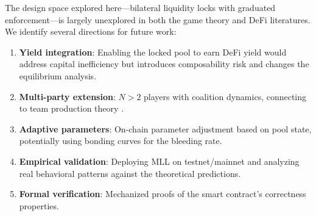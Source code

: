 \documentclass[12pt,a4paper]{article}
\begin{document}
The design space explored here---bilateral liquidity locks with graduated enforcement---is largely unexplored in both the game theory and DeFi literatures. We identify several directions for future work:

\begin{enumerate}
\item \textbf{Yield integration}: Enabling the locked pool to earn DeFi yield would address capital inefficiency but introduces composability risk and changes the equilibrium analysis.
\item \textbf{Multi-party extension}: $N > 2$ players with coalition dynamics, connecting to team production theory \citep{holmstrom1982}.
\item \textbf{Adaptive parameters}: On-chain parameter adjustment based on pool state, potentially using bonding curves for the bleeding rate.
\item \textbf{Empirical validation}: Deploying MLL on testnet/mainnet and analyzing real behavioral patterns against the theoretical predictions.
\item \textbf{Formal verification}: Mechanized proofs of the smart contract's correctness properties.
\end{enumerate}




\end{document}
